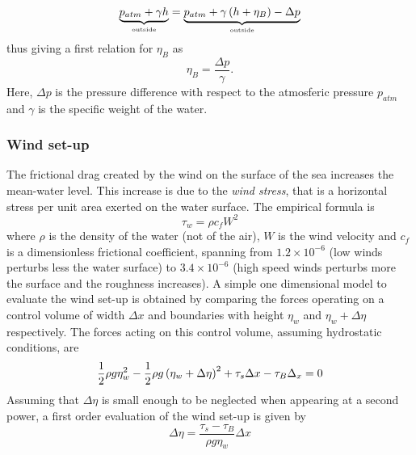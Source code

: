 \begin{equation}
\underbrace{p_{atm}+\gamma h}_{\text{\tiny outside}}=\underbrace{p_{atm}+\gamma \left( h+\eta_{B} \right)-\Delta p}_{\text{\tiny outside}}
\end{equation}
thus giving a first relation for $\eta_{B}$ as
\begin{equation}
\eta_{B}=\dfrac{\Delta p}{\gamma}.
\end{equation}
Here, $\Delta p$ is the pressure difference with respect to the atmosferic pressure $p_{atm}$ and $\gamma$ is the specific weight of the water.
\subsubsection*{Wind set-up}
The frictional drag created by the wind on the surface of the sea increases the mean-water level. This increase is due to the \textit{wind stress}, that is a horizontal stress per unit area exerted on the water surface. The empirical formula is
\begin{equation}
\tau_{w}=\rho c_{f} W^{2}
\end{equation}
where $\rho$ is the density of the water (not of the air), $W$ is the wind velocity and $c_{f}$ is a dimensionless frictional coefficient, spanning from $1.2\times10^{-6}$ (low winds perturbs less the water surface) to $3.4\times10^{-6}$ (high speed winds perturbs more the surface and the roughness increases). A simple one dimensional model to evaluate the wind set-up is obtained by comparing the forces operating on a control volume of width $\Delta x$ and boundaries with height $\eta_{w}$ and $\eta_{w}+\Delta\eta$ respectively. The forces acting on this control volume, assuming hydrostatic conditions, are
\begin{equation*}
\dfrac{1}{2}\rho g \eta_{w}^{2}-\dfrac{1}{2}\rho g\left(  \eta_{w}+\Delta\eta \right)^{2}+\tau_{s}\Delta x-\tau_{B}\Delta_{x}=0
\end{equation*}
Assuming that $\Delta\eta$ is small enough to be neglected when appearing at a second power, a first order evaluation of the wind set-up is given by
\begin{equation}
\Delta\eta=\dfrac{\tau_{s}-\tau_{B}}{\rho g \eta_{w}}\Delta x
\end{equation}
